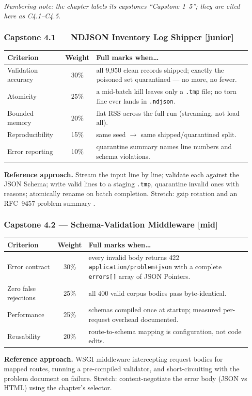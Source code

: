 \emph{Numbering note: the chapter labels its capstones ``Capstone 1--5'';
they are cited here as C4.1--C4.5.}

\subsubsection*{Capstone 4.1 --- NDJSON Inventory Log Shipper [junior]}
\begin{center}\small
\begin{tabularx}{\textwidth}{l c X}
\toprule
\textbf{Criterion} & \textbf{Weight} & \textbf{Full marks when\ldots} \\
\midrule
Validation accuracy & 30\% & all 9{,}950 clean records shipped; exactly the poisoned set quarantined --- no more, no fewer. \\
Atomicity & 25\% & a mid-batch kill leaves only a \texttt{.tmp} file; no torn line ever lands in \texttt{.ndjson}. \\
Bounded memory & 20\% & flat RSS across the full run (streaming, not load-all). \\
Reproducibility & 15\% & same seed $\to$ same shipped/quarantined split. \\
Error reporting & 10\% & quarantine summary names line numbers and schema violations. \\
\bottomrule
\end{tabularx}
\end{center}
\textbf{Reference approach.} Stream the input line by line; validate each
against the JSON Schema; write valid lines to a staging \texttt{.tmp},
quarantine invalid ones with reasons; atomically rename on batch
completion. Stretch: gzip rotation and an RFC~9457 problem summary
\cite{rfc9457}.

\subsubsection*{Capstone 4.2 --- Schema-Validation Middleware [mid]}
\begin{center}\small
\begin{tabularx}{\textwidth}{l c X}
\toprule
\textbf{Criterion} & \textbf{Weight} & \textbf{Full marks when\ldots} \\
\midrule
Error contract & 30\% & every invalid body returns 422 \texttt{application/problem+json} with a complete \texttt{errors[]} array of JSON Pointers. \\
Zero false rejections & 25\% & all 400 valid corpus bodies pass byte-identical. \\
Performance & 25\% & schemas compiled once at startup; measured per-request overhead documented. \\
Reusability & 20\% & route-to-schema mapping is configuration, not code edits. \\
\bottomrule
\end{tabularx}
\end{center}
\textbf{Reference approach.} WSGI middleware intercepting request bodies
for mapped routes, running a pre-compiled validator, and short-circuiting
with the problem document on failure. Stretch: content-negotiate the error
body (JSON vs HTML) using the chapter's selector.

